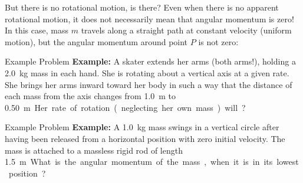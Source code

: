 \documentclass[12pt,compress,aspectratio=169]{beamer}
\begin{document}
\begin{frame}{But there is no rotational motion, is there?}
  Even when there is no apparent rotational motion, it does not necessarily
  mean that angular momentum is zero! In this case, mass $m$ travels along a
  straight path at constant velocity (uniform motion), but the angular momentum
  around point $P$ is not zero:
  \begin{center}
  \end{center}
\end{frame}



\begin{frame}{Example Problem}
  \textbf{Example:} A skater extends her arms (both arms!), holding a
  \SI{2.0}{\kilo\gram} mass in each hand. She is rotating about a vertical axis
  at a given rate. She brings her arms inward toward her body in such a way that
  the distance of each mass from the axis changes from \SI{1.0}{\metre} to
  \SI{.50}\metre. Her rate of rotation (neglecting her own mass) will?
\end{frame}




\begin{frame}{Example Problem}
  \textbf{Example:} A \SI{1.0}{\kilo\gram} mass swings in a vertical circle
  after having been released from a horizontal position with zero initial
  velocity. The mass is attached to a massless rigid rod of length
  \SI{1.5}\metre. What is the angular momentum of the mass, when it is in its
  lowest position?
\end{frame}
\end{document}
